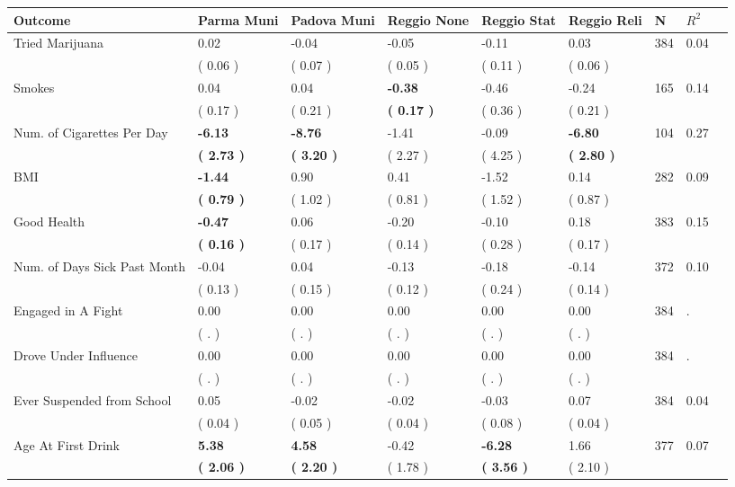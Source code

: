 \begin{tabular}{L{6.2cm} C{1.8cm} C{1.8cm} C{1.8cm} C{1.8cm} C{1.8cm} C{1.8cm} C{0.3cm} C{0.3cm}}
\toprule
 \textbf{Outcome} & \textbf{Parma Muni} & \textbf{Padova Muni} & \textbf{Reggio None} & \textbf{Reggio Stat} & \textbf{Reggio Reli} & \textbf{N} & \textbf{$ R^2$} \\
\midrule
Tried Marijuana &      0.02 &     -0.04 &     -0.05 &     -0.11 &      0.03  & 384 &       0.04 \\ 
 & (     0.06 ) & (     0.07 ) & (     0.05 ) & (     0.11 ) & (     0.06 )  & \\
Smokes &      0.04 &      0.04 & \textbf{    -0.38} &     -0.46 &     -0.24  & 165 &       0.14 \\ 
 & (     0.17 ) & (     0.21 ) & \textbf{(     0.17 )} & (     0.36 ) & (     0.21 )  & \\
Num. of Cigarettes Per Day & \textbf{    -6.13} & \textbf{    -8.76} &     -1.41 &     -0.09 & \textbf{    -6.80}  & 104 &       0.27 \\ 
 & \textbf{(     2.73 )} & \textbf{(     3.20 )} & (     2.27 ) & (     4.25 ) & \textbf{(     2.80 )}  & \\
BMI & \textbf{    -1.44} &      0.90 &      0.41 &     -1.52 &      0.14  & 282 &       0.09 \\ 
 & \textbf{(     0.79 )} & (     1.02 ) & (     0.81 ) & (     1.52 ) & (     0.87 )  & \\
Good Health & \textbf{    -0.47} &      0.06 &     -0.20 &     -0.10 &      0.18  & 383 &       0.15 \\ 
 & \textbf{(     0.16 )} & (     0.17 ) & (     0.14 ) & (     0.28 ) & (     0.17 )  & \\
Num. of Days Sick Past Month &     -0.04 &      0.04 &     -0.13 &     -0.18 &     -0.14  & 372 &       0.10 \\ 
 & (     0.13 ) & (     0.15 ) & (     0.12 ) & (     0.24 ) & (     0.14 )  & \\
Engaged in A Fight &      0.00 &      0.00 &      0.00 &      0.00 &      0.00  & 384 &          . \\ 
 & (        . ) & (        . ) & (        . ) & (        . ) & (        . )  & \\
Drove Under Influence &      0.00 &      0.00 &      0.00 &      0.00 &      0.00  & 384 &          . \\ 
 & (        . ) & (        . ) & (        . ) & (        . ) & (        . )  & \\
Ever Suspended from School &      0.05 &     -0.02 &     -0.02 &     -0.03 &      0.07  & 384 &       0.04 \\ 
 & (     0.04 ) & (     0.05 ) & (     0.04 ) & (     0.08 ) & (     0.04 )  & \\
Age At First Drink & \textbf{     5.38} & \textbf{     4.58} &     -0.42 & \textbf{    -6.28} &      1.66  & 377 &       0.07 \\ 
 & \textbf{(     2.06 )} & \textbf{(     2.20 )} & (     1.78 ) & \textbf{(     3.56 )} & (     2.10 )  & \\
\bottomrule
\end{tabular}
